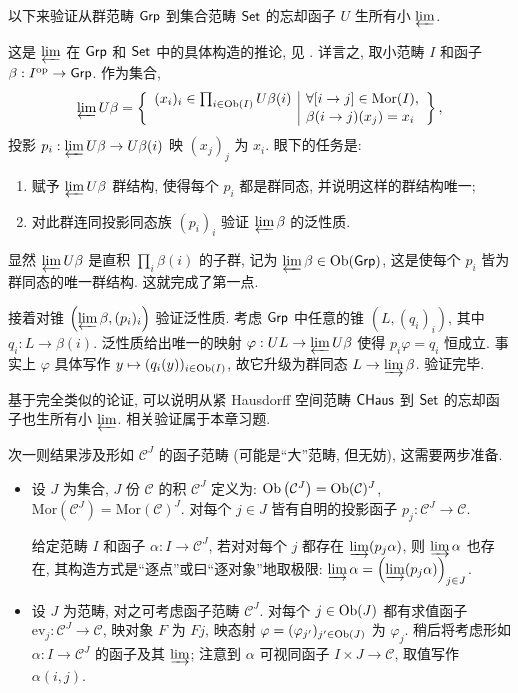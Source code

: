 \begin{example}\label{eg:Grp-Set-create}
	以下来验证从群范畴 $\mathsf{Grp}$ 到集合范畴 $\mathsf{Set}$ 的忘却函子 $U$ 生所有小 $\varprojlim$.
	
	这是 $\varprojlim$ 在 $\mathsf{Grp}$ 和 $\mathsf{Set}$ 中的具体构造的推论, 见 \cite[例 2.7.5 和 2.8.7]{Li1}. 详言之, 取小范畴 $I$ 和函子 $\beta: I^{\operatorname{op}} \to \mathsf{Grp}$. 作为集合,
	\[ \varprojlim U\beta = \left\{\begin{array}{r|l}
		(x_i)_i \in \prod_{i \in \operatorname{Ob}(I)} U\beta(i) & \forall [i \to j] \in \mathrm{Mor}(I), \\
		& \beta(i \to j)(x_j) = x_i
	\end{array}\right\}, \]
	投影 $p_i: \varprojlim U\beta \to U\beta(i)$ 映 $(x_j)_j$ 为 $x_i$. 眼下的任务是:
	\begin{enumerate}
		\item 赋予 $\varprojlim U\beta$ 群结构, 使得每个 $p_i$ 都是群同态, 并说明这样的群结构唯一;
		\item 对此群连同投影同态族 $(p_i)_i$ 验证 $\varprojlim \beta$ 的泛性质. 
	\end{enumerate}

	显然 $\varprojlim U\beta$ 是直积 $\prod_i \beta(i)$ 的子群, 记为 $\varprojlim \beta \in \operatorname{Ob}(\mathsf{Grp})$, 这是使每个 $p_i$ 皆为群同态的唯一群结构. 这就完成了第一点.
	
	接着对锥 $\left( \varprojlim \beta, (p_i)_i\right)$ 验证泛性质. 考虑 $\mathsf{Grp}$ 中任意的锥 $(L, (q_i)_i)$, 其中 $q_i: L \to \beta(i)$. 泛性质给出唯一的映射 $\varphi: UL \to \varprojlim U\beta$ 使得 $p_i \varphi = q_i$ 恒成立. 事实上 $\varphi$ 具体写作 $y \mapsto (q_i(y))_{i \in \operatorname{Ob}(I)}$, 故它升级为群同态 $L \to \varinjlim \beta$. 验证完毕.
\end{example}

基于完全类似的论证, 可以说明从紧 Hausdorff 空间范畴 $\mathsf{CHaus}$ 到 $\mathsf{Set}$ 的忘却函子也生所有小 $\varprojlim$. 相关验证属于本章习题.

次一则结果涉及形如 $\mathcal{C}^J$ 的函子范畴 (可能是``大''范畴, 但无妨), 这需要两步准备.

\begin{itemize}
	\item 设 $J$ 为集合, $J$ 份 $\mathcal{C}$ 的积 $\mathcal{C}^J$ 定义为: $\operatorname{Ob}\left(\mathcal{C}^J\right) = \operatorname{Ob}(\mathcal{C})^J$, $\mathrm{Mor}\left(\mathcal{C}^J \right) = \mathrm{Mor}(\mathcal{C})^J$. 对每个 $j \in J$ 皆有自明的投影函子 $p_j: \mathcal{C}^J \to \mathcal{C}$.

	给定范畴 $I$ 和函子 $\alpha: I \to \mathcal{C}^J$, 若对对每个 $j$ 都存在 $\varinjlim (p_j \alpha)$, 则 $\varinjlim \alpha$ 也存在, 其构造方式是``逐点''或曰``逐对象''地取极限: $\varinjlim \alpha = \left( \varinjlim (p_j \alpha) \right)_{j \in J}$.

	\item 设 $J$ 为范畴, 对之可考虑函子范畴 $\mathcal{C}^J$. 对每个 $j \in \operatorname{Ob}(J)$ 都有求值函子 $\mathrm{ev}_j: \mathcal{C}^J \to \mathcal{C}$, 映对象 $F$ 为 $Fj$, 映态射 $\varphi = (\varphi_{j'})_{j' \in \operatorname{Ob}(J)}$ 为 $\varphi_j$. 稍后将考虑形如 $\alpha: I \to \mathcal{C}^J$ 的函子及其 $\varinjlim$; 注意到 $\alpha$ 可视同函子 $I \times J \to \mathcal{C}$, 取值写作 $\alpha(i, j)$.
\end{itemize}

